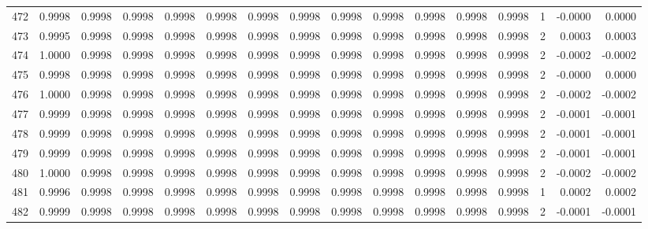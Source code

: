 \begin{tabular}{lrrrrrrrrrrrrrrr}
472 &      0.9998 &  0.9998 &  0.9998 &  0.9998 &  0.9998 &  0.9998 &  0.9998 &  0.9998 &  0.9998 &  0.9998 &   0.9998 &     0.9998 &      1 &                   -0.0000 &                     0.0000 \\
473 &      0.9995 &  0.9998 &  0.9998 &  0.9998 &  0.9998 &  0.9998 &  0.9998 &  0.9998 &  0.9998 &  0.9998 &   0.9998 &     0.9998 &      2 &                    0.0003 &                     0.0003 \\
474 &      1.0000 &  0.9998 &  0.9998 &  0.9998 &  0.9998 &  0.9998 &  0.9998 &  0.9998 &  0.9998 &  0.9998 &   0.9998 &     0.9998 &      2 &                   -0.0002 &                    -0.0002 \\
475 &      0.9998 &  0.9998 &  0.9998 &  0.9998 &  0.9998 &  0.9998 &  0.9998 &  0.9998 &  0.9998 &  0.9998 &   0.9998 &     0.9998 &      2 &                   -0.0000 &                     0.0000 \\
476 &      1.0000 &  0.9998 &  0.9998 &  0.9998 &  0.9998 &  0.9998 &  0.9998 &  0.9998 &  0.9998 &  0.9998 &   0.9998 &     0.9998 &      2 &                   -0.0002 &                    -0.0002 \\
477 &      0.9999 &  0.9998 &  0.9998 &  0.9998 &  0.9998 &  0.9998 &  0.9998 &  0.9998 &  0.9998 &  0.9998 &   0.9998 &     0.9998 &      2 &                   -0.0001 &                    -0.0001 \\
478 &      0.9999 &  0.9998 &  0.9998 &  0.9998 &  0.9998 &  0.9998 &  0.9998 &  0.9998 &  0.9998 &  0.9998 &   0.9998 &     0.9998 &      2 &                   -0.0001 &                    -0.0001 \\
479 &      0.9999 &  0.9998 &  0.9998 &  0.9998 &  0.9998 &  0.9998 &  0.9998 &  0.9998 &  0.9998 &  0.9998 &   0.9998 &     0.9998 &      2 &                   -0.0001 &                    -0.0001 \\
480 &      1.0000 &  0.9998 &  0.9998 &  0.9998 &  0.9998 &  0.9998 &  0.9998 &  0.9998 &  0.9998 &  0.9998 &   0.9998 &     0.9998 &      2 &                   -0.0002 &                    -0.0002 \\
481 &      0.9996 &  0.9998 &  0.9998 &  0.9998 &  0.9998 &  0.9998 &  0.9998 &  0.9998 &  0.9998 &  0.9998 &   0.9998 &     0.9998 &      1 &                    0.0002 &                     0.0002 \\
482 &      0.9999 &  0.9998 &  0.9998 &  0.9998 &  0.9998 &  0.9998 &  0.9998 &  0.9998 &  0.9998 &  0.9998 &   0.9998 &     0.9998 &      2 &                   -0.0001 &                    -0.0001 \\

\end{tabular}
